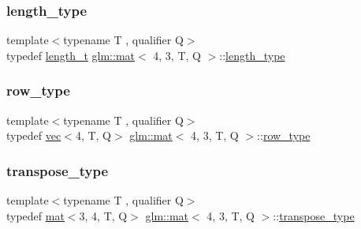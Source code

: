 \mbox{\label{structglm_1_1mat_3_014_00_013_00_01_t_00_01_q_01_4_a24f0f2085bebe0a6e79da267368e74f5}} 
\subsubsection{\texorpdfstring{length\+\_\+type}{length\_type}}
{\footnotesize\ttfamily template$<$typename T , qualifier Q$>$ \\
typedef \hyperlink{namespaceglm_a090a0de2260835bee80e71a702492ed9}{length\+\_\+t} \hyperlink{structglm_1_1mat}{glm\+::mat}$<$ 4, 3, T, Q $>$\+::\hyperlink{structglm_1_1mat_3_014_00_013_00_01_t_00_01_q_01_4_a24f0f2085bebe0a6e79da267368e74f5}{length\+\_\+type}}

\mbox{\label{structglm_1_1mat_3_014_00_013_00_01_t_00_01_q_01_4_ab68daf8d119fa525c762d6ba0bc08538}} 
\subsubsection{\texorpdfstring{row\+\_\+type}{row\_type}}
{\footnotesize\ttfamily template$<$typename T , qualifier Q$>$ \\
typedef \hyperlink{structglm_1_1vec}{vec}$<$4, T, Q$>$ \hyperlink{structglm_1_1mat}{glm\+::mat}$<$ 4, 3, T, Q $>$\+::\hyperlink{structglm_1_1mat_3_014_00_013_00_01_t_00_01_q_01_4_ab68daf8d119fa525c762d6ba0bc08538}{row\+\_\+type}}

\mbox{\label{structglm_1_1mat_3_014_00_013_00_01_t_00_01_q_01_4_ab3a05b21cd6b51243140b2bdbf77108a}} 
\subsubsection{\texorpdfstring{transpose\+\_\+type}{transpose\_type}}
{\footnotesize\ttfamily template$<$typename T , qualifier Q$>$ \\
typedef \hyperlink{structglm_1_1mat}{mat}$<$3, 4, T, Q$>$ \hyperlink{structglm_1_1mat}{glm\+::mat}$<$ 4, 3, T, Q $>$\+::\hyperlink{structglm_1_1mat_3_014_00_013_00_01_t_00_01_q_01_4_ab3a05b21cd6b51243140b2bdbf77108a}{transpose\+\_\+type}}

